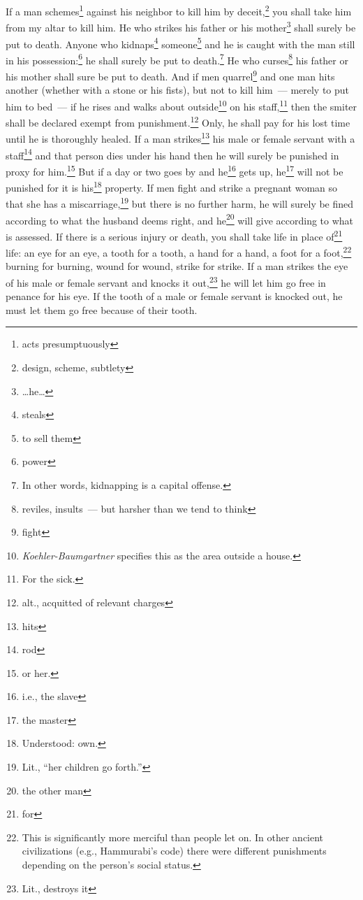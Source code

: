 \begin{inparaenum}
     If a man schemes\footnote{acts presumptuously} against his neighbor to kill him by deceit,\footnote{design, scheme, subtlety} you shall take him from my altar to kill him.%
     He who strikes his father or his mother\footnote{\dots he\dots} shall surely be put to death.%
     Anyone who kidnaps\footnote{steals} someone\footnote{to sell them} and he is caught with the man still in his possession:\footnote{power} he shall surely be put to death.\footnote{In other words, kidnapping is a capital offense.}%
     He who curses\footnote{reviles, insults~--- but harsher than we tend to think} his father or his mother shall sure be put to death.%
     And if men quarrel\footnote{fight} and one man hits another (whether with a stone or his fists), but not to kill him~--- merely to put him to bed~---%
     if he rises and walks about outside\footnote{\textit{Koehler-Baumgartner} specifies this as the area outside a house.} on his staff,\footnote{For the sick.} then the smiter shall be declared exempt from punishment.\footnote{alt., acquitted of relevant charges} Only, he shall pay for his lost time until he is thoroughly healed.%
     If a man strikes\footnote{hits} his male or female servant with a staff\footnote{rod} and that person dies under his hand then he will surely be punished in proxy for him.\footnote{or her.}%
     But if a day or two goes by and he\footnote{i.e., the slave} gets up, he\footnote{the master} will not be punished for it is his\footnote{Understood: own.} property.%
     If men fight and strike a pregnant woman so that she has a miscarriage,\footnote{Lit., ``her children go forth.''} but there is no further harm, he will surely be fined according to what the husband deems right, and he\footnote{the other man} will give according to what is assessed.%
     If there is a serious injury or death, you shall take life in place of\footnote{for} life:%
     an eye for an eye, a tooth for a tooth, a hand for a hand, a foot for a foot,\footnote{This is significantly more merciful than people let on. In other ancient civilizations (e.g., Hammurabi's code) there were different punishments depending on the person's social status.}%
     burning for burning, wound for wound, strike for strike.%
     If a man strikes the eye of his male or female servant and knocks it out,\footnote{Lit., destroys it} he will let him go free in penance for his eye.%
     If the tooth of a male or female servant is knocked out, he must let them go free because of their tooth.%

\end{inparaenum}
